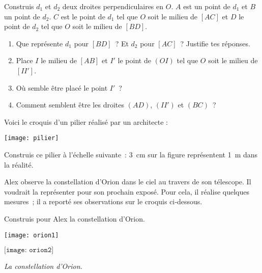 \begin{exercice}
Construis $d_1$ et $d_2$ deux droites perpendiculaires en $O$. $A$ est un point de $d_1$ et $B$ un point de $d_2$. $C$ est le point de $d_1$ tel que $O$ soit le milieu de $[AC]$ et $D$ le point de $d_2$ tel que $O$ soit le milieu de $[BD]$.
\begin{enumerate}
 \item Que représente $d_1$ pour $[BD]$ ? Et $d_2$ pour $[AC]$ ? Justifie tes réponses.
 \item Place $I$ le milieu de $[AB]$ et $I'$ le point de $(OI)$ tel que $O$ soit le milieu de $[II']$.
 \item Où semble être placé le point $I'$ ?
 \item Comment semblent être les droites $(AD)$, $(II')$ et $(BC)$ ?
 \end{enumerate}
\end{exercice}


\begin{exercice}
Voici le croquis d'un pilier réalisé par un architecte :
\begin{center} \texttt{[image: pilier]} \end{center}
Construis ce pilier à l’échelle suivante : 3 cm sur la figure représentent 1 m dans la réalité.
\end{exercice}


\begin{exercice}[Orion]
Alex observe la constellation d'Orion dans le ciel au travers de son télescope. Il voudrait la représenter pour son prochain exposé. Pour cela, il réalise quelques mesures ; il a reporté ses observations sur le croquis ci‑dessous.

Construis pour Alex la constellation d'Orion.
\begin{center} \texttt{[image: orion1]} \end{center}
\begin{center} $\boxed{\texttt{[image: orion2]}}$ 

{\footnotesize\emph{La constellation d'Orion.}} \end{center}
\end{exercice}